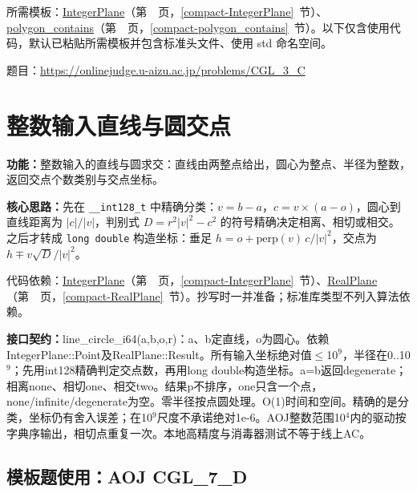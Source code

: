 所需模板：\hyperref[compact-IntegerPlane]{IntegerPlane}（第~\pageref{compact-IntegerPlane}~页，\ref{compact-IntegerPlane}~节）、\hyperref[compact-polygon_contains]{polygon\_\allowbreak{}contains}（第~\pageref{compact-polygon_contains}~页，\ref{compact-polygon_contains}~节）。以下仅含使用代码，默认已粘贴所需模板并包含标准头文件、使用 std 命名空间。

题目：\url{https://onlinejudge.u-aizu.ac.jp/problems/CGL_3_C}



\Needspace{465pt}

\section{整数输入直线与圆交点}\label{compact-line_circle_i64}

\noindent\textbf{功能：}\allowbreak 整数输入的直线与圆求交：直线由两整点给出，圆心为整点、半径为整数，返回交点个数类别与交点坐标。

\textbf{核心思路：}\allowbreak 先在 \texttt{\_\_int128\_t} 中精确分类：$v=b-a$，$c=v\times(a-o)$，圆心到直线距离为 $|c|/|v|$，判别式 $D=r^2|v|^2-c^2$ 的符号精确决定相离、相切或相交。之后才转成 \texttt{long double} 构造坐标：垂足 $h=o+\mathrm{perp}(v)\,c/|v|^2$，交点为 $h\mp v\sqrt D/|v|^2$。

代码依赖：\hyperref[compact-IntegerPlane]{IntegerPlane}（第~\pageref{compact-IntegerPlane}~页，\ref{compact-IntegerPlane}~节）、\hyperref[compact-RealPlane]{RealPlane}（第~\pageref{compact-RealPlane}~页，\ref{compact-RealPlane}~节）。抄写时一并准备；标准库类型不列入算法依赖。

{\sloppy{}\noindent\textbf{接口契约：}line\_circle\_i64(a,b,o,r)：a、b定直线，o为圆心。依赖IntegerPlane::Point及RealPlane::Result。所有输入坐标绝对值$\le$10$^{9}$，半径在0..10$^{9}$；先用int128精确判定交点数，再用long double构造坐标。a=b返回degenerate；相离none、相切one、相交two。结果p不排序，one只含一个点，none/infinite/degenerate为空。零半径按点圆处理。O(1)时间和空间。精确的是分类，坐标仍有舍入误差；在10$^{9}$尺度不承诺绝对1e-6。AOJ整数范围10$^{4}$内的驱动按字典序输出，相切点重复一次。本地高精度与消毒器测试不等于线上AC。\par}



\Needspace{414pt}

\subsection*{模板题使用：AOJ CGL\_7\_D}

